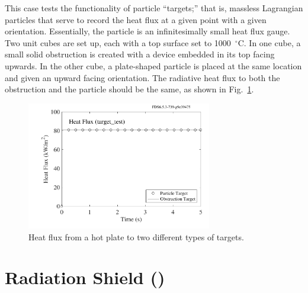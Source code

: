 \documentclass[11pt]{book}
\begin{document}
This case tests the functionality of particle ``targets;'' that is, massless Lagrangian particles that serve to record the heat flux at a given point with a given orientation. Essentially, the particle is an infinitesimally small heat flux gauge. Two unit cubes are set up, each with a top surface set to 1000~$^\circ$C. In one cube, a small solid obstruction is created with a device embedded in its top facing upwards. In the other cube, a plate-shaped particle is placed at the same location and given an upward facing orientation. The radiative heat flux to both the obstruction and the particle should be the same, as shown in Fig.~\ref{target_test_plot}.
\begin{figure}[ht]
\centering
\includegraphics[height=2.2in]{SCRIPT_FIGURES/target_test}
\caption[The  case]{Heat flux from a hot plate to two different types of targets.}
\label{target_test_plot}
\end{figure}



\section{Radiation Shield (\texorpdfstring{}{radiation\_shield}) }
\label{radiation_shield}
\end{document}
